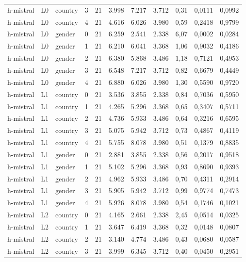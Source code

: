 \begin{landscape}
\begin{longtable}{lllrrrrrrrr}
h-mistral & L0 & country & 3 & 21 & 3.998 & 7.217 & 3.712 & 0,31 & 0,0111 & 0,0992 \\
h-mistral & L0 & country & 4 & 21 & 4.616 & 6.026 & 3.980 & 0,59 & 0,2418 & 0,9799 \\
h-mistral & L0 & gender & 0 & 21 & 6.259 & 2.541 & 2.338 & 6,07 & 0,0002 & 0,0284 \\
h-mistral & L0 & gender & 1 & 21 & 6.210 & 6.041 & 3.368 & 1,06 & 0,9032 & 0,4186 \\
h-mistral & L0 & gender & 2 & 21 & 6.380 & 5.868 & 3.486 & 1,18 & 0,7121 & 0,4953 \\
h-mistral & L0 & gender & 3 & 21 & 6.548 & 7.217 & 3.712 & 0,82 & 0,6679 & 0,4449 \\
h-mistral & L0 & gender & 4 & 21 & 6.880 & 6.026 & 3.980 & 1,30 & 0,5590 & 0,9720 \\
h-mistral & L1 & country & 0 & 21 & 3.536 & 3.855 & 2.338 & 0,84 & 0,7036 & 0,5950 \\
h-mistral & L1 & country & 1 & 21 & 4.265 & 5.296 & 3.368 & 0,65 & 0,3407 & 0,5711 \\
h-mistral & L1 & country & 2 & 21 & 4.736 & 5.933 & 3.486 & 0,64 & 0,3216 & 0,6595 \\
h-mistral & L1 & country & 3 & 21 & 5.075 & 5.942 & 3.712 & 0,73 & 0,4867 & 0,4119 \\
h-mistral & L1 & country & 4 & 21 & 5.755 & 8.078 & 3.980 & 0,51 & 0,1379 & 0,8835 \\
h-mistral & L1 & gender & 0 & 21 & 2.881 & 3.855 & 2.338 & 0,56 & 0,2017 & 0,9518 \\
h-mistral & L1 & gender & 1 & 21 & 5.102 & 5.296 & 3.368 & 0,93 & 0,8690 & 0,9393 \\
h-mistral & L1 & gender & 2 & 21 & 4.962 & 5.933 & 3.486 & 0,70 & 0,4311 & 0,2914 \\
h-mistral & L1 & gender & 3 & 21 & 5.905 & 5.942 & 3.712 & 0,99 & 0,9774 & 0,7473 \\
h-mistral & L1 & gender & 4 & 21 & 5.926 & 8.078 & 3.980 & 0,54 & 0,1746 & 0,1021 \\
h-mistral & L2 & country & 0 & 21 & 4.165 & 2.661 & 2.338 & 2,45 & 0,0514 & 0,0325 \\
h-mistral & L2 & country & 1 & 21 & 3.647 & 6.419 & 3.368 & 0,32 & 0,0148 & 0,0807 \\
h-mistral & L2 & country & 2 & 21 & 3.140 & 4.774 & 3.486 & 0,43 & 0,0680 & 0,0587 \\
h-mistral & L2 & country & 3 & 21 & 3.999 & 6.345 & 3.712 & 0,40 & 0,0450 & 0,2951 \\

\end{longtable}
\end{landscape}
